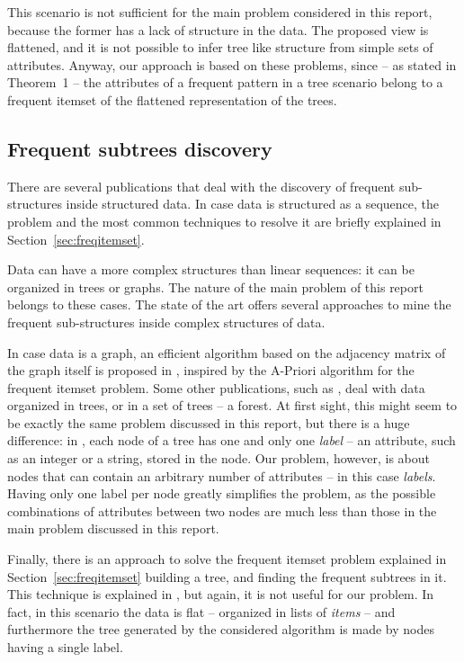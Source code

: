 \documentclass{acm_proc_article-sp-sigmod09}
\begin{document}
This scenario is not sufficient for the main problem considered in this report, because the former has a lack of structure in the data. The proposed view is flattened, and it is not possible to infer tree like structure from simple sets of attributes. Anyway, our approach is based on these problems, since -- as stated in Theorem~1 -- the attributes of a frequent pattern in a tree scenario belong to a frequent itemset of the flattened representation of the trees.

\subsection{Frequent subtrees discovery}
There are several publications that deal with the discovery of frequent sub-structures inside structured data. In case data is structured as a sequence, the problem and the most common techniques to resolve it are briefly explained in Section~\ref{sec:freqitemset}.

Data can have a more complex structures than linear sequences: it can be organized in trees or graphs. The nature of the main problem of this report belongs to these cases. The state of the art offers several approaches to mine the frequent sub-structures inside complex structures of data.

In case data is a graph, an efficient algorithm based on the adjacency matrix of the graph itself is proposed in \cite{inokuchi2000apriori, kuramochi2001frequent}, inspired by the A-Priori algorithm for the frequent itemset problem. Some other publications, such as \cite{zaki2002efficiently}, deal with data organized in trees, or in a set of trees -- a forest. At first sight, this might seem to be exactly the same problem discussed in this report, but there is a huge difference: in \cite{zaki2002efficiently}, each node of a tree has one and only one \emph{label} -- an attribute, such as an integer or a string, stored in the node. Our problem, however, is about nodes that can contain an arbitrary number of attributes -- in this case \emph{labels}. Having only one label per node greatly simplifies the problem, as the possible combinations of attributes between two nodes are much less than those in the main problem discussed in this report.

Finally, there is an approach to solve the frequent itemset problem explained in Section~\ref{sec:freqitemset} building a tree, and finding the frequent subtrees in it. This technique is explained in \cite{han2004mining}, but again, it is not useful for our problem. In fact, in this scenario the data is flat -- organized in lists of \emph{items} -- and furthermore the tree generated by the considered algorithm is made by nodes having a single label.
\end{document}
